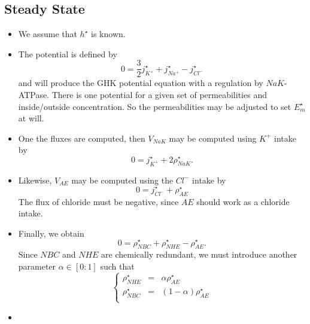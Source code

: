 \documentclass{revtex4}
\begin{document}
\subsection{Steady State}
\begin{itemize}
\item We assume that $h^\star$ is known.
\item
The potential is defined by
\begin{equation}
	0 = \dfrac{3}{2}j_{K^+}^\star + j_{Na^+}^\star - j_{Cl^-}^\star
\end{equation}
and will produce the GHK potential equation with a regulation by $NaK$-ATPase.
There is one potential for a given set of permeabilities and inside/outside concentration.
So the permeabilities may be adjusted to set $E_m^\star$ at will.
\item One the fluxes are computed, then $V_{NaK}$ may be computed using $K^+$ intake by
	\begin{equation}
		0 = j_{K^+}^\star + 2 \rho_{NaK}^\star.
	\end{equation}
\item Likewise, $V_{AE}$ may be computed using the $Cl^-$ intake by
	\begin{equation}
		0 = j_{Cl^-}^\star + \rho_{AE}^\star
	\end{equation}
	The flux of chloride must be negative, since $AE$ should work as a chloride intake.
\item Finally, we obtain
\begin{equation}
	0 = \rho_{NBC}^\star+\rho_{NHE}^\star - \rho_{AE}^\star.
\end{equation}
Since $NBC$ and $NHE$ are chemically redundant, we must introduce another parameter $\alpha\in[0:1]$
such that 
\begin{equation}
	\left\lbrace
	\begin{array}{rcr}
	\rho_{NHE}^\star & = & \alpha \rho_{AE}^\star\\
	\rho_{NBC}^\star & = & (1-\alpha) \rho_{AE}^\star\\ 
	\end{array}
	\right.
\end{equation}


\item


\end{itemize}
\end{document}
